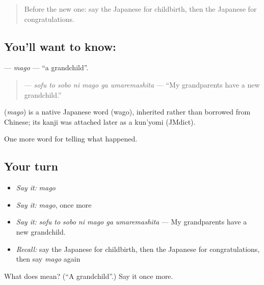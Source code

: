 \label{lesson:JA-C286-mago}



\begin{quote}
Before the new one: say the Japanese for childbirth, then the Japanese for congratulations.
\end{quote}

\subsection*{You'll want to know: }
\textbf{} — \emph{mago} — \textquotedblleft{}a grandchild\textquotedblright{}.

\begin{quote}
\textbf{   } — \emph{sofu to sobo ni mago ga umaremashita} — \textquotedblleft{}My grandparents have a new grandchild.\textquotedblright{}
\end{quote}

\begin{cousinweb}
\textbf{} (\emph{mago}) is a native Japanese word (wago), inherited rather than borrowed from Chinese; its kanji was attached later as a kun'yomi (JMdict).
\end{cousinweb}

\begin{grammarlens}[title={What you've built}]
One more word for telling what happened.
\end{grammarlens}

\subsection*{Your turn}
\begin{itemize}
\raggedright
  \item \emph{Say it:} \emph{mago}
  \item \emph{Say it:} \emph{mago}, once more
  \item \emph{Say it:} \emph{sofu to sobo ni mago ga umaremashita} — My grandparents have a new grandchild.
  \item \emph{Recall:} say the Japanese for childbirth, then the Japanese for congratulations, then say \emph{mago} again
\end{itemize}

\begin{tcolorbox}[breakable,colback=teal!4,colframe=teal!35!black,title={Before you move on}]
What does  mean? (\textquotedblleft{}A grandchild\textquotedblright{}.) Say it once more.
\end{tcolorbox}
